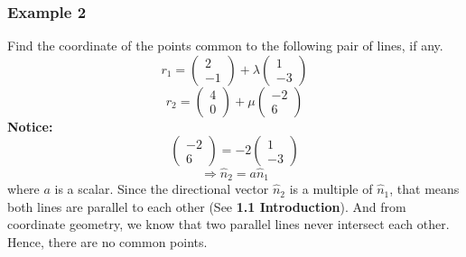 \documentclass[hidelinks, a4paper, 12pt]{article}
\newcommand{\bd}{\textbf}
\newcommand{\thus}{\Rightarrow}
\newcommand{\nhat}{\hat{n}}
\begin{document}
            \subsubsection{Example 2}
                Find the coordinate of the points common to the following pair of lines, if any.
                \[r_1 = \begin{pmatrix} 2 \\ -1 \end{pmatrix} + \lambda \begin{pmatrix} 1 \\ -3 \end{pmatrix}\]
                \[r_2 = \begin{pmatrix} 4 \\ 0 \end{pmatrix} + \mu \begin{pmatrix} -2 \\ 6 \end{pmatrix}\]
                \bd{Notice: }
                \[\begin{pmatrix} -2 \\ 6 \end{pmatrix} = -2 \begin{pmatrix} 1 \\ -3 \end{pmatrix}\]
                \[\thus \nhat_2 = a \nhat_1\]
                where $a$ is a scalar. Since the directional vector $\nhat_2$ is a multiple of $\nhat_1$, that means
                both lines are parallel to each other (See \bd{1.1 Introduction}). And from coordinate geometry, we know that two parallel lines never
                intersect each other. Hence, there are no common points.
\end{document}

